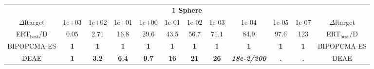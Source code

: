 \begin{tabular}{cccccccccccc}
 & \multicolumn{10}{c}{{\normalsize \textbf{1 Sphere}}}\\
$\Delta$ftarget& 1e+03& 1e+02& 1e+01& 1e+00& 1e-01& 1e-02& 1e-03& 1e-04& 1e-05& 1e-07 & $\Delta$ftarget \\
ERT$_{\textrm{best}}$/D& 0.05& 2.71& 16.8& 29.6& 43.5& 56.7& 71.1& 84.9& 97.6& 123 & ERT$_{\textrm{best}}$/D \\
\hline
BIPOPCMA-ES & \textbf{1} & \textbf{1} & \textbf{1} & \textbf{1} & \textbf{1} & \textbf{1} & \textbf{1} & \textbf{1} & \textbf{1} & \textbf{1} & BIPOPCMA-ES \cite{add_an_entry_for_BIPOPCMA-ES_in_bbob.bib}\\
DEAE & \textbf{1} & \textbf{3.2} & \textbf{6.4} & \textbf{9.7} & \textbf{16} & \textbf{21} & \textbf{26} & \textbf{\textit{18e-2}\textit{/200}} & \textbf{.} & \textbf{.} & DEAE \cite{add_an_entry_for_DEAE_in_bbob.bib}
\end{tabular}
